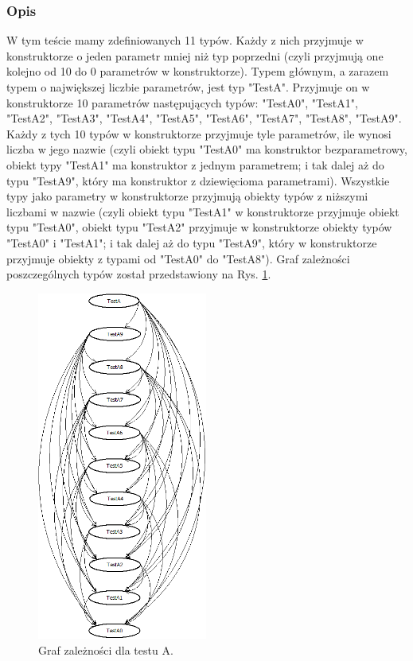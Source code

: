 \documentclass[12pt]{article}
\begin{document}
\subsubsection{Opis}
W tym teście mamy zdefiniowanych 11 typów. Każdy z nich przyjmuje w konstruktorze o jeden parametr mniej niż typ poprzedni (czyli przyjmują one kolejno od 10 do 0 parametrów w konstruktorze). Typem głównym, a zarazem typem o największej liczbie parametrów, jest typ "TestA". Przyjmuje on w konstruktorze 10 parametrów następujących typów: "TestA0", "TestA1", "TestA2", "TestA3", "TestA4", "TestA5", "TestA6", "TestA7", "TestA8", "TestA9". Każdy z tych 10 typów w konstruktorze przyjmuje tyle parametrów, ile wynosi liczba w jego nazwie (czyli obiekt typu "TestA0" ma konstruktor bezparametrowy, obiekt typy "TestA1" ma konstruktor z jednym parametrem; i tak dalej aż do typu "TestA9", który ma konstruktor z dziewięcioma parametrami). Wszystkie typy jako parametry w konstruktorze przyjmują obiekty typów z niższymi liczbami w nazwie (czyli obiekt typu "TestA1" w konstruktorze przyjmuje obiekt typu "TestA0", obiekt typu "TestA2" przyjmuje w konstruktorze obiekty typów "TestA0" i "TestA1"; i tak dalej aż do typu "TestA9", który w konstruktorze przyjmuje obiekty z typami od "TestA0" do "TestA8"). Graf zależności poszczególnych typów został przedstawiony na Rys. \ref{fig:testA}.\\
\begin{figure}[H]
	\begin{center}
  		\includegraphics[height=11.5cm]{TestA.png}
  		\caption{Graf zależności dla testu A.}
  		\label{fig:testA}
	\end{center}
\end{figure}
\end{document}
